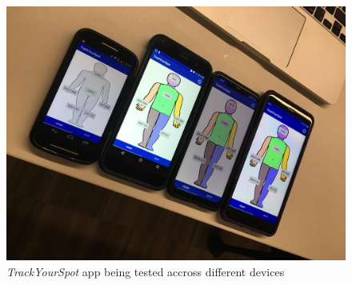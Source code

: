 \begin{figure}
    \includegraphics[width=1.2\textwidth, center]{figures/4devicestesting.jpg}
    \caption{\emph{TrackYourSpot} app being tested accross different devices}
    \label{fig:4devicestesting}
\end{figure}

